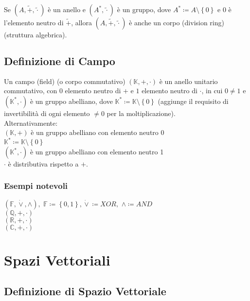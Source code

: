 \documentclass[a4paper, twoside, italian, 11pt]{book}
\newcommand{\braces}[1] {\left \{ #1 \right \}}
\newcommand{\Q}{\mathbb Q}
\newcommand{\R}{\mathbb R}
\newcommand{\C}{\mathbb C}
\newcommand{\K}{\mathbb K}
\newcommand{\F}{\mathbb F}
\begin{document}
Se $(A, \tilde +, \tilde \cdot)$ è un anello e $(A^*, \tilde\cdot)$ è un gruppo, dove $A^* \coloneqq A \setminus \braces{0}$ e $0$ è l'elemento neutro di $\tilde +$, allora $(A, \tilde +, \tilde\cdot)$ è anche un corpo (division ring) (struttura algebrica). \\



\section{Definizione di Campo}

Un campo (field) (o corpo commutativo) $(\K, +, \cdot)$ è un anello unitario commutativo, con $0$ elemento neutro di $+$ e $1$ elemento neutro di $\cdot$, in cui $0 \neq 1$ e $(\K^*, \cdot)$ è un gruppo abelliano, dove $\K^* \coloneqq \K \setminus \braces{0}$ (aggiunge il requisito di invertibilità di ogni elemento $\neq 0$ per la moltiplicazione). \\

\noindent
Alternativamente: \\

$(\K, +)$ è un gruppo abelliano con elemento neutro 0 \\
\indent
$\K^* \coloneqq \K \setminus \braces{0}$ \\
\indent
$(\K^*, \cdot)$ è un gruppo abelliano con elemento neutro 1 \\
\indent
$\cdot$ è distributiva rispetto a $+$.


\subsection{Esempi notevoli}

$(\F, \dot\lor, \land),$ $\F \coloneqq \braces{0, 1}, \dot\lor \coloneqq XOR,$ $\land \coloneqq AND$ \\
$(\Q, +, \cdot)$ \\
$(\R, +, \cdot)$ \\
$(\C, +, \cdot)$





\chapter {Spazi Vettoriali}



\section{Definizione di Spazio Vettoriale}
\end{document}
